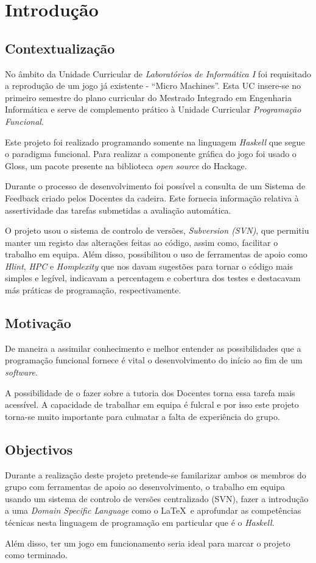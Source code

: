\chapter{Introdução}

  \section{Contextualização}
  No âmbito da Unidade Curricular de \emph{Laboratórios de Informática I} foi
  requisitado a reprodução de um jogo já existente - ``Micro Machines''. Esta UC
  insere-se no primeiro semestre do plano curricular do Mestrado Integrado em
  Engenharia Informática e serve de complemento prático à Unidade Curricular
  \emph{Programação Funcional}.

  Este projeto foi realizado programando somente na linguagem \emph{Haskell} que
  segue o paradigma funcional. Para realizar a componente gráfica do jogo foi
  usado o Gloss, um pacote presente na biblioteca \emph{open source} do
  Hackage.

  Durante o processo de desenvolvimento foi possível a consulta de um Sistema de
  Feedback criado pelos Docentes da cadeira. Este fornecia informação relativa à
  assertividade das tarefas submetidas a avaliação automática.

  O projeto usou o sistema de controlo de versões, \emph{Subversion (SVN)}, que
  permitiu manter um registo das alterações feitas ao código, assim como,
  facilitar o trabalho em equipa. Além disso, possibilitou o uso de ferramentas
  de apoio como \emph{Hlint}, \emph{HPC} e \emph{Homplexity} que nos davam
  sugestões para tornar o código mais simples e legível, indicavam a percentagem
  e cobertura dos testes e destacavam más práticas de programação,
  respectivamente.

  \section{Motivação}
  De maneira a assimilar conhecimento e melhor entender as possibilidades que a
  programação funcional fornece é vital o desenvolvimento do início ao fim de um
  \emph{software}.

  A possibilidade de o fazer sobre a tutoria dos Docentes torna essa tarefa mais
  acessível. A capacidade de trabalhar em equipa é fulcral e por isso este
  projeto torna-se muito importante para culmatar a falta de experiência do
  grupo.

  \section{Objectivos}
  Durante a realização deste projeto pretende-se familarizar ambos os membros do
  grupo com ferramentas de apoio ao desenvolvimento, o trabalho em equipa usando
  um sistema de controlo de versões centralizado (SVN), fazer a introdução a uma
  \emph{Domain Specific Language} como o \LaTeX \ e aprofundar as competências
  técnicas nesta linguagem de programação em particular que é o \emph{Haskell}.

  Além disso, ter um jogo em funcionamento seria ideal para marcar o projeto
  como terminado.
